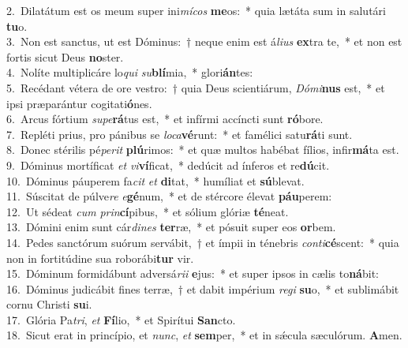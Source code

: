 {2.~}Dilatátum est os meum super ini\textit{mí}\textit{cos} \textbf{me}os:~* quia lætáta sum in salutári \textbf{tu}o.\\
{3.~}Non est sanctus, ut est Dóminus:~† neque enim est á\textit{li}\textit{us} \textbf{ex}tra te,~* et non est fortis sicut Deus \textbf{no}ster.\\
{4.~}Nolíte multiplicáre lo\textit{qui} \textit{su}\textbf{blí}mia,~* glori\textbf{án}tes:\\
{5.~}Recédant vétera de ore vestro:~† quia Deus scientiárum, \textit{Dó}\textit{mi}\textbf{nus} est,~* et ipsi præparántur cogitati\textbf{ó}nes.\\
{6.~}Arcus fórtium \textit{su}\textit{pe}\textbf{rá}tus est,~* et infírmi accíncti sunt \textbf{ró}bore.\\
{7.~}Repléti prius, pro pánibus se \textit{lo}\textit{ca}\textbf{vé}runt:~* et famélici satu\textbf{rá}ti sunt.\\
{8.~}Donec stérilis pé\textit{pe}\textit{rit} \textbf{plú}rimos:~* et quæ multos habébat fílios, infir\textbf{má}ta est.\\
{9.~}Dóminus mortíficat \textit{et} \textit{vi}\textbf{ví}ficat,~* dedúcit ad ínferos et re\textbf{dú}cit.\\
{10.~}Dóminus páuperem fa\textit{cit} \textit{et} \textbf{di}tat,~* humíliat et \textbf{sú}blevat.\\
{11.~}Súscitat de púlve\textit{re} \textit{e}\textbf{gé}num,~* et de stércore élevat \textbf{páu}perem:\\
{12.~}Ut sédeat \textit{cum} \textit{prin}\textbf{cí}pibus,~* et sólium glóriæ \textbf{té}neat.\\
{13.~}Dómini enim sunt cár\textit{di}\textit{nes} \textbf{ter}ræ,~* et pósuit super eos \textbf{or}bem.\\
{14.~}Pedes sanctórum suórum servábit,~† et ímpii in ténebris \textit{con}\textit{ti}\textbf{cé}scent:~* quia non in fortitúdine sua roborábi\textbf{tur} vir.\\
{15.~}Dóminum formidábunt adversá\textit{ri}\textit{i} \textbf{e}jus:~* et super ipsos in cælis to\textbf{ná}bit:\\
{16.~}Dóminus judicábit fines terræ,~† et dabit impérium \textit{re}\textit{gi} \textbf{su}o,~* et sublimábit cornu Christi \textbf{su}i.\\
{17.~}Glória Pa\textit{tri}, \textit{et} \textbf{Fí}lio,~* et Spirítui \textbf{San}cto.\\
{18.~}Sicut erat in princípio, et \textit{nunc}, \textit{et} \textbf{sem}per,~* et in sǽcula sæculórum. \textbf{A}men.\\

